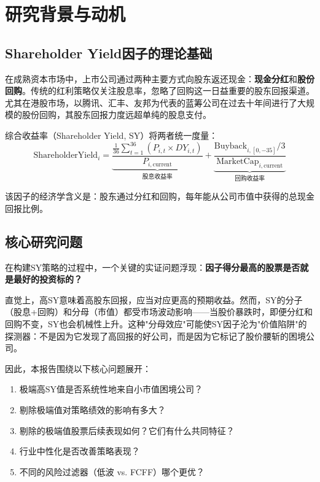 \documentclass[10pt,a4paper]{ctexart}
\begin{document}
\section{研究背景与动机}

\subsection{Shareholder Yield因子的理论基础}

在成熟资本市场中，上市公司通过两种主要方式向股东返还现金：\textbf{现金分红}和\textbf{股份回购}。传统的红利策略仅关注股息率，忽略了回购这一日益重要的股东回报渠道。尤其在港股市场，以腾讯、汇丰、友邦为代表的蓝筹公司在过去十年间进行了大规模的股份回购，其股东回报力度远超单纯的股息支付。

综合收益率（Shareholder Yield, SY）将两者统一度量：
\begin{equation}
\text{ShareholderYield}_i = \underbrace{\frac{\frac{1}{36}\sum_{t=1}^{36} (P_{i,t} \times DY_{i,t})}{P_{i,\text{current}}}}_{\text{股息收益率}} + \underbrace{\frac{\text{Buyback}_{i,[0,-35]} / 3}{\text{MarketCap}_{i,\text{current}}}}_{\text{回购收益率}}
\end{equation}

该因子的经济学含义是：股东通过分红和回购，每年能从公司市值中获得的总现金回报比例。

\subsection{核心研究问题}

在构建SY策略的过程中，一个关键的实证问题浮现：\textbf{因子得分最高的股票是否就是最好的投资标的？}

直觉上，高SY意味着高股东回报，应当对应更高的预期收益。然而，SY的分子（股息+回购）和分母（市值）都受市场波动影响——当股价暴跌时，即便分红和回购不变，SY也会机械性上升。这种"分母效应"可能使SY因子沦为"价值陷阱"的探测器：不是因为它发现了高回报的好公司，而是因为它标记了股价腰斩的困境公司。

因此，本报告围绕以下核心问题展开：
\begin{enumerate}[label=(\arabic*)]
    \item 极端高SY值是否系统性地来自小市值困境公司？
    \item 剔除极端值对策略绩效的影响有多大？
    \item 剔除的极端值股票后续表现如何？它们有什么共同特征？
    \item 行业中性化是否改善策略表现？
    \item 不同的风险过滤器（低波 vs. FCFF）哪个更优？
\end{enumerate}
\end{document}
